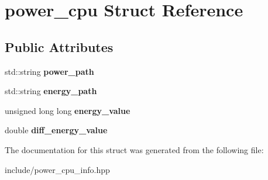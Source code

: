\hypertarget{structpower__cpu}{}\section{power\+\_\+cpu Struct Reference}
\label{structpower__cpu}
\subsection*{Public Attributes}
\begin{DoxyCompactItemize}
\item 
\mbox{\label{structpower__cpu_a88c624726361b03c0c8d76a50c0593cc}} 
std\+::string {\bfseries power\+\_\+path}
\item 
\mbox{\label{structpower__cpu_a254313fe85e2d0632b8aeba42fa24a60}} 
std\+::string {\bfseries energy\+\_\+path}
\item 
\mbox{\label{structpower__cpu_ad4fb845b4ff96fcfda479f6f03141a97}} 
unsigned long long {\bfseries energy\+\_\+value}
\item 
\mbox{\label{structpower__cpu_a244cb476bca41df55c9328ea514821b5}} 
double {\bfseries diff\+\_\+energy\+\_\+value}
\end{DoxyCompactItemize}


The documentation for this struct was generated from the following file\+:\begin{DoxyCompactItemize}
\item 
include/power\+\_\+cpu\+\_\+info.\+hpp\end{DoxyCompactItemize}
